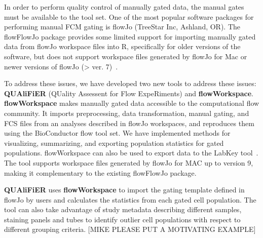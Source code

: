 \documentclass[10pt]{bmc_article}
\newenvironment{bmcformat}{\baselineskip20pt\sloppy\setboolean{publ}{false}}{\baselineskip20pt\sloppy}
\begin{document}
\begin{bmcformat}
In order to perform quality control of manually gated data, the manual gates must be available to the tool set. One of the most popular software packages for performing manual FCM gating is flowJo (TreeStar Inc, Ashland, OR). The flowFlowJo package provides some limited support for importing manually gated data from flowJo workspace files into R, specifically for older versions of the software, but does not support workspace files generated by flowJo for Mac or newer versions of flowJo (> ver. 7)~\cite{Gosink:2009iq}. 

To address these issues, we have developed two new tools to address these issues: \textbf{QUAliFiER} (QUality Assessent for Flow ExpeRiments) and \textbf{flowWorkspace}. \textbf{flowWorkspace} makes manually gated data accessible to the computational flow community. It imports preprocessing, data transformation, manual gating, and FCS files from an analyses described in flowJo workspaces, and reproduces them using the BioConductor flow tool set. We have implemented methods for visualizing, summarizing, and exporting population statistics for gated populations. flowWorkspace can also be used to export data to the LabKey tool~\cite{Shulman:2008jv}. The tool supports workspace files generated by flowJo for MAC up to version 9, making it complementary to the existing flowFlowJo package. 

\textbf{QUAliFiER} uses \textbf{flowWorkspace} to import the gating
template defined in flowJo by users and calculates the statistics from each
gated cell population. The tool can also take advantage of study metadata describing different samples, staining panels and tubes to  identify outlier cell populations with respect to different grouping criteria. [MIKE PLEASE PUT A MOTIVATING EXAMPLE]



\end{bmcformat}
\end{document}

